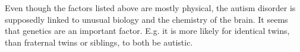 Even though the factors listed above are mostly physical, the autism disorder is supposedly linked to unusual biology and the chemistry of the brain.
It seems that genetics are an important factor. E.g. it is more likely for identical twins, than fraternal twins or siblings, to both be autistic\cite{autism}.